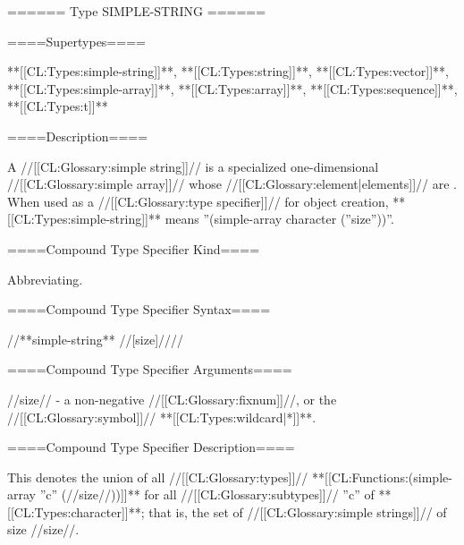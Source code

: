 ====== Type SIMPLE-STRING ======

====Supertypes====

**[[CL:Types:simple-string]]**, **[[CL:Types:string]]**, **[[CL:Types:vector]]**, **[[CL:Types:simple-array]]**, **[[CL:Types:array]]**, **[[CL:Types:sequence]]**, **[[CL:Types:t]]**

====Description====

A //[[CL:Glossary:simple string]]// is a specialized one-dimensional //[[CL:Glossary:simple array]]// whose //[[CL:Glossary:element|elements]]// are . When used as a //[[CL:Glossary:type specifier]]// for object creation, **[[CL:Types:simple-string]]** means ''(simple-array character (''size''))''.

====Compound Type Specifier Kind====

Abbreviating.

====Compound Type Specifier Syntax====

//**simple-string** //[size]////

====Compound Type Specifier Arguments====

//size// - a non-negative //[[CL:Glossary:fixnum]]//, or the //[[CL:Glossary:symbol]]// **[[CL:Types:wildcard|*]]**.

====Compound Type Specifier Description====

This denotes the union of all //[[CL:Glossary:types]]// **[[CL:Functions:(simple-array ''c'' (//size//))]]** for all //[[CL:Glossary:subtypes]]// ''c'' of **[[CL:Types:character]]**; that is, the set of //[[CL:Glossary:simple strings]]// of size //size//.

  

